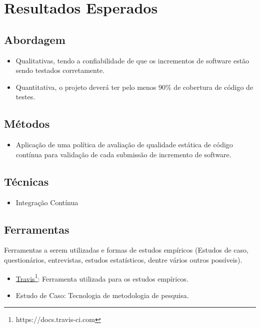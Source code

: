 \section{Resultados Esperados}
\subsection{Abordagem}
\begin{itemize}
    \item Qualitativas, tendo a confiabilidade de que os incrementos de software estão sendo testados corretamente.
    \item Quantitativa, o projeto deverá ter pelo menos 90\% de cobertura de código de testes.
\end{itemize}

\subsection{Métodos}
\begin{itemize}
    \item Aplicação de uma política de avaliação de qualidade estática de código contínua para validação de cada submissão de incremento de software.
\end{itemize}

\subsection{Técnicas}
\begin{itemize}
    \item Integração Contínua
\end{itemize}

\subsection{Ferramentas}
Ferramentas a serem utilizadas e formas de estudos empíricos (Estudos de caso, questionários, entrevistas, estudos estatísticos, dentre vários outros possíveis).
\begin{itemize}
  \item \href{https://docs.travis-ci.com}{Travis}\footnote{https://docs.travis-ci.com}: Ferramenta utilizada para os estudos empíricos.
    \item Estudo de Caso: Tecnologia de metodologia de pesquisa.
\end{itemize}
